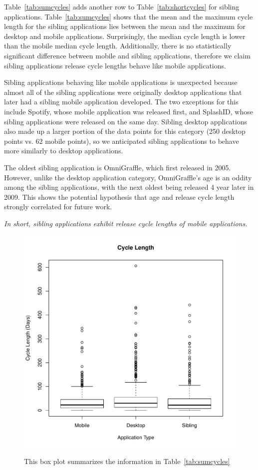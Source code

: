 \documentclass{acm_proc_article-sp}
\begin{document}
Table~\ref{tab:sumcycles} adds another row to Table~\ref{tab:shortcycles} for sibling applications. 
Table~\ref{tab:sumcycles} shows that the mean and the maximum cycle length for the sibling applications lies between the mean and the maximum for desktop and mobile applications. 
Surprisingly, the median cycle length is lower than the mobile median cycle length. 
Additionally, there is no statistically significant difference between mobile and sibling applications, therefore we claim sibling applications release cycle lengths behave like mobile applications.


Sibling applications behaving like mobile applications is unexpected because almost all of the sibling applications were originally desktop applications that later had a sibling mobile application developed.
The two exceptions for this include Spotify, whose mobile application was released first, and SplashID, whose sibling applications were released on the same day.
Sibling desktop applications also made up a larger portion of the data points for this category (250 desktop points vs. 62 mobile points), so we anticipated sibling applications to behave more similarly to desktop applications.

The oldest sibling application is OmniGraffle, which first released in 2005.
However, unlike the desktop application category, OmniGraffle's age is an oddity among the sibling applications, with the next oldest being released 4 year later in 2009. 
This shows the potential hypothesis that age and release cycle length strongly correlated for future work.

\textit{In short, sibling applications exhibit release cycle lengths of mobile applications.}

\begin{figure}
\begin{center}
\includegraphics[width=.5\textwidth]{CycleBoxPlot.pdf}
\label{fig:CycleBox}
\caption{This box plot summarizes the information in Table~\ref{tab:sumcycles}}
\end{center}
\end{figure}
\end{document}
